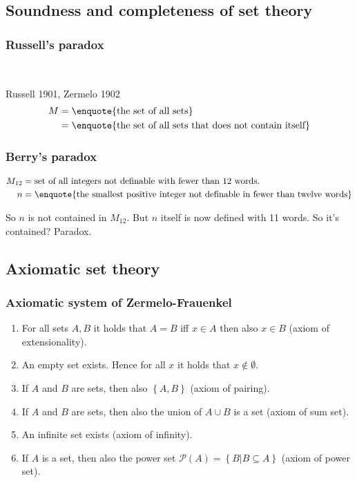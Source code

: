 \documentclass[a4paper,landscape,twocolumn]{article}
\newcommand\set[1]{\left\{#1\right\}}
\begin{document}
\subsection{Soundness and completeness of set theory}
\subsubsection{Russell's paradox}

 \\

Russell 1901, Zermelo 1902
\begin{align*}
  M &= \text{\enquote{the set of all sets}} \\
    &= \text{\enquote{the set of all sets that does not contain itself}}
\end{align*}

\subsubsection{Berry's paradox}
\begin{align*}
  M_{12} &= \text{set of all integers not definable with fewer than 12 words.} \\
       n &= \text{\enquote{the smallest positive integer not definable in fewer than twelve words}}
\end{align*}

So $n$ is not contained in $M_{12}$. But $n$ itself is now defined with 11 words.
So it's contained? Paradox.

\subsection{Axiomatic set theory}

\subsubsection{Axiomatic system of Zermelo-Frauenkel}

\begin{enumerate}
  \item For all sets $A, B$ it holds that $A = B$ iff $x \in A$ then also $x \in B$ (axiom of extensionality).
  \item An empty set exists. Hence for all $x$ it holds that $x \notin \emptyset$.
  \item If $A$ and $B$ are sets, then also $\set{A, B}$ (axiom of pairing).
  \item If $A$ and $B$ are sets, then also the union of  $A \cup B$ is a set (axiom of sum set).
  \item An infinite set exists (axiom of infinity).
  \item If $A$ is a set, then also the power set $\mathcal{P}(A) = \set{B | B \subseteq A}$ (axiom of power set).
\end{enumerate}
\end{document}

